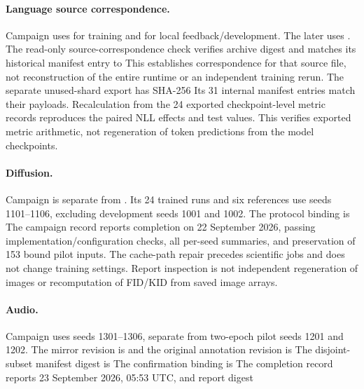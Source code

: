 \paragraph{Language source correspondence.}
Campaign  uses
 for training and
for local feedback/development.
The later 
uses .
The read-only source-correspondence check verifies archive digest
and matches its historical
 manifest entry to
This establishes correspondence for that source file, not reconstruction
of the entire runtime or an independent training rerun. The separate
unused-shard export has SHA-256
Its 31 internal manifest entries match their payloads. Recalculation from
the 24 exported checkpoint-level metric records reproduces the paired
NLL effects and test values. This verifies exported metric arithmetic,
not regeneration of token predictions from the model checkpoints.

\paragraph{Diffusion.}
Campaign  is separate from
.
Its 24 trained runs and six references use seeds
1101--1106, excluding development seeds 1001 and 1002.
The protocol binding is
The campaign record reports completion on 22 September 2026,
passing implementation/configuration checks, all per-seed
summaries, and preservation of 153 bound pilot inputs.
The cache-path repair precedes scientific jobs and does
not change training settings.
Report inspection is not independent regeneration of images
or recomputation of FID/KID from saved image arrays.

\paragraph{Audio.}
Campaign  uses seeds
1301--1306, separate from two-epoch pilot seeds 1201 and 1202.
The mirror revision is
and the original annotation revision is
The disjoint-subset manifest digest is
The confirmation binding is
The completion record reports 23 September 2026,
05:53 UTC, and report digest

